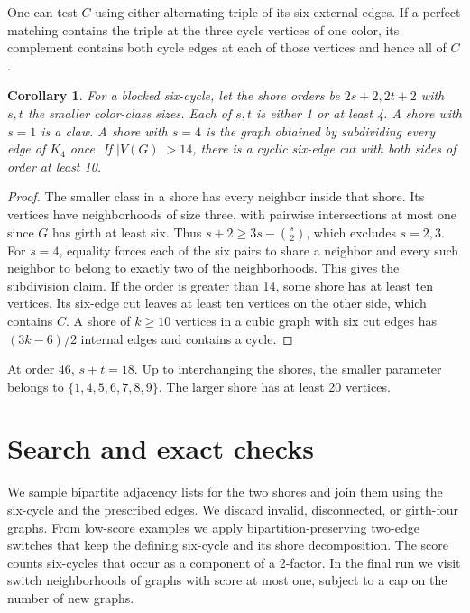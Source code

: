 \documentclass[11pt]{article}
\newtheorem{corollary}{Corollary}
\begin{document}
One can test \(C\) using either alternating triple of its six
external edges. If a perfect matching contains the triple at the
three cycle vertices of one color, its complement contains both
cycle edges at each of those vertices and hence all of \(C\).

\begin{corollary}
For a blocked six-cycle, let the shore orders be \(2s+2,2t+2\) with
\(s,t\) the smaller color-class sizes. Each of \(s,t\) is either
1 or at least 4. A shore with \(s=1\) is a claw. A shore with
\(s=4\) is the graph obtained by subdividing every edge of \(K_4\) once.
If \(\lvert V(G)\rvert>14\), there is a cyclic six-edge cut with
both sides of order at least 10.
\end{corollary}

\begin{proof}
The smaller class in a shore has every neighbor inside that shore.
Its vertices have neighborhoods of size three, with pairwise
intersections at most one since \(G\) has girth at least six.
Thus \(s+2\geq 3s-\binom{s}{2}\), which excludes \(s=2,3\).
For \(s=4\), equality forces each of the six pairs to share
a neighbor and every such neighbor to belong to exactly two of
the neighborhoods. This gives the subdivision claim. If the
order is greater than 14, some shore has at least ten vertices.
Its six-edge cut leaves at least ten vertices on the other side,
which contains \(C\). A shore of \(k\geq10\) vertices in a cubic
graph with six cut edges has \((3k-6)/2\) internal edges and
contains a cycle.
\end{proof}

At order 46, \(s+t=18\). Up to interchanging the shores, the smaller
parameter belongs to \(\{1,4,5,6,7,8,9\}\). The larger shore has at
least 20 vertices.

\newpage
\section{Search and exact checks}
We sample bipartite adjacency lists for the two shores and join them
using the six-cycle and the prescribed edges. We discard invalid,
disconnected, or girth-four graphs. From low-score examples we
apply bipartition-preserving two-edge switches that keep the
defining six-cycle and its shore decomposition. The score counts
six-cycles that occur as a component of a 2-factor. In the final
run we visit switch neighborhoods of graphs with score at most one,
subject to a cap on the number of new graphs.
\end{document}
